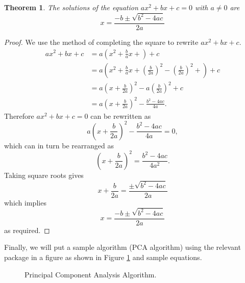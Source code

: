 \documentclass[a4paper,onesided,12pt]{report}
\newtheorem{thm}{Theorem}[chapter]
\begin{document}
\begin{thm}
The solutions of the equation $ax^2+bx+c=0$ with $a\neq 0$ are
$$
x=\frac{-b\pm \sqrt{b^2-4ac}}{2a}
$$
\end{thm}


\begin{proof}
We use the method of completing the square to rewrite $ax^2+bx+c$.
\begin{align*}
ax^2+bx+c&=a\left( x^2 + \frac{b}{a}x+\right)+c \\
  &=a\left( x^2 + \frac{b}{a}x+ \left(\frac{b}{2a}\right)^2
     -\left(\frac{b}{2a}\right)^2 +\right)+c \\
  &=a\left( x+\frac{b}{2a}\right)^2 - 
a\left(\frac{b}{2a}\right)^2+c\\
  &= a\left( x+\frac{b}{2a}\right)^2- \frac{b^2-4ac}{4a}.
\end{align*}
Therefore $ax^2+bx+c=0$ can be rewritten as 
$$
a\left( x+\frac{b}{2a}\right)^2- \frac{b^2-4ac}{4a}=0,
$$
which can in turn  be rearranged as
$$
\left( x+\frac{b}{2a}\right)^2= \frac{b^2-4ac}{4a^2}.
$$
Taking square roots gives
$$
x+\frac{b}{2a}= \frac{\pm \sqrt{b^2-4ac}}{2a}
$$
which implies
$$
x=\frac{-b\pm \sqrt{b^2-4ac}}{2a}
$$
as required.
\end{proof}
Finally, we will put a sample algorithm (PCA algorithm) using the
relevant package in a figure as shown in Figure \ref{alg:pca} and
sample equations.

\begin{figure}[htbp]
\label{alg:pca}
\begin{center}
\end{center}
\caption[Principal Component Analysis Algorithm]{Principal Component
Analysis Algorithm.}
\end{figure}
\end{document}
